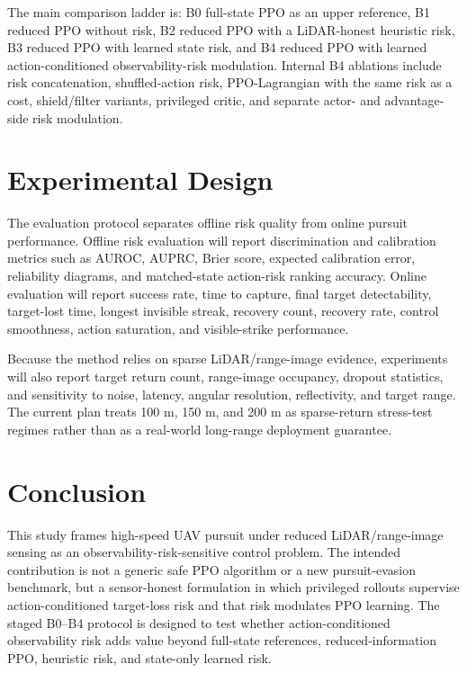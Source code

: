 \documentclass[lettersize,journal]{IEEEtran}
\begin{document}
The main comparison ladder is: B0 full-state PPO as an upper reference, B1 reduced PPO without risk, B2 reduced PPO with a LiDAR-honest heuristic risk, B3 reduced PPO with learned state risk, and B4 reduced PPO with learned action-conditioned observability-risk modulation. Internal B4 ablations include risk concatenation, shuffled-action risk, PPO-Lagrangian with the same risk as a cost, shield/filter variants, privileged critic, and separate actor- and advantage-side risk modulation.

\section{Experimental Design}

The evaluation protocol separates offline risk quality from online pursuit performance. Offline risk evaluation will report discrimination and calibration metrics such as AUROC, AUPRC, Brier score, expected calibration error, reliability diagrams, and matched-state action-risk ranking accuracy. Online evaluation will report success rate, time to capture, final target detectability, target-lost time, longest invisible streak, recovery count, recovery rate, control smoothness, action saturation, and visible-strike performance.

Because the method relies on sparse LiDAR/range-image evidence, experiments will also report target return count, range-image occupancy, dropout statistics, and sensitivity to noise, latency, angular resolution, reflectivity, and target range. The current plan treats 100 m, 150 m, and 200 m as sparse-return stress-test regimes rather than as a real-world long-range deployment guarantee.

\section{Conclusion}

This study frames high-speed UAV pursuit under reduced LiDAR/range-image sensing as an observability-risk-sensitive control problem. The intended contribution is not a generic safe PPO algorithm or a new pursuit-evasion benchmark, but a sensor-honest formulation in which privileged rollouts supervise action-conditioned target-loss risk and that risk modulates PPO learning. The staged B0--B4 protocol is designed to test whether action-conditioned observability risk adds value beyond full-state references, reduced-information PPO, heuristic risk, and state-only learned risk.

\balance


\end{document}
